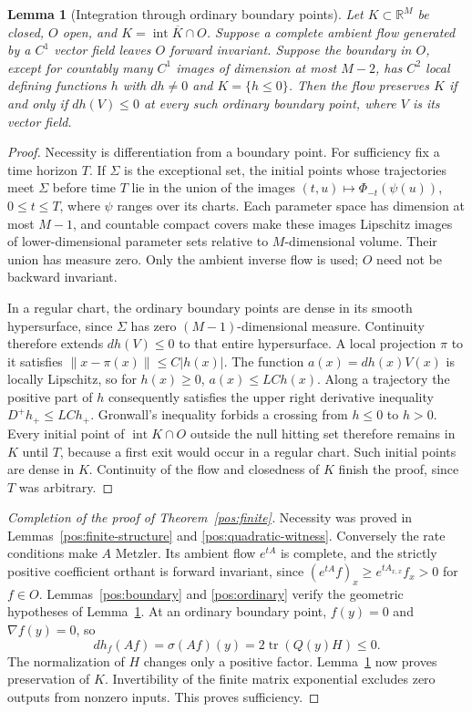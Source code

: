 \documentclass[reqno]{amsart}
\newtheorem{lemma}[theorem]{Lemma}
\theoremstyle{definition}
\theoremstyle{remark}
\newcommand{\R}{\mathbb R}
\begin{document}
\begin{lemma}[Integration through ordinary boundary points]\label{pos:integration}
Let \(K\subset\R^M\) be closed, \(O\) open, and
\(K=\overline{\operatorname{int}K\cap O}\).
Suppose a complete ambient flow generated by a \(C^1\) vector field leaves
\(O\) forward invariant.
Suppose the boundary in \(O\), except for countably many \(C^1\) images of
dimension at most \(M-2\), has \(C^2\) local defining functions \(h\) with
\(dh\ne0\) and \(K=\{h\le0\}\).
Then the flow preserves \(K\) if and only if \(dh(V)\le0\) at every such
ordinary boundary point, where \(V\) is its vector field.
\end{lemma}
\begin{proof}
Necessity is differentiation from a boundary point.
For sufficiency fix a time horizon \(T\).  If \(\Sigma\) is the exceptional set,
the initial points whose trajectories meet \(\Sigma\) before time \(T\) lie in
the union of the images
\((t,u)\mapsto\Phi_{-t}(\psi(u))\), \(0\le t\le T\), where \(\psi\) ranges
over its charts.  Each parameter space has dimension at most \(M-1\), and
countable compact covers make these images Lipschitz images of lower-dimensional
parameter sets relative to \(M\)-dimensional volume.  Their union has measure zero.
Only the ambient inverse flow is used; \(O\) need not be backward invariant.

In a regular chart, the ordinary boundary points are dense in its smooth
hypersurface, since \(\Sigma\) has zero \((M-1)\)-dimensional measure.
Continuity therefore extends \(dh(V)\le0\) to that entire hypersurface.
A local projection \(\pi\) to it satisfies
\(\|x-\pi(x)\|\le C|h(x)|\).
The function \(a(x)=dh(x)V(x)\) is locally Lipschitz, so for \(h(x)\ge0\),
\(a(x)\le LC h(x)\).
Along a trajectory the positive part of \(h\) consequently satisfies the upper
right derivative inequality \(D^+h_+\le LC h_+\).
Gronwall's inequality forbids a crossing from \(h\le0\) to \(h>0\).
Every initial point of \(\operatorname{int}K\cap O\) outside the null hitting set
therefore remains in \(K\) until \(T\), because a first exit would occur in a
regular chart.  Such initial points are dense in \(K\).
Continuity of the flow and closedness of \(K\) finish the proof, since \(T\)
was arbitrary.
\end{proof}

\begin{proof}[Completion of the proof of Theorem~\ref{pos:finite}]
Necessity was proved in Lemmas~\ref{pos:finite-structure} and
\ref{pos:quadratic-witness}.  Conversely the rate conditions make \(A\) Metzler.
Its ambient flow \(e^{tA}\) is complete, and the strictly positive coefficient
orthant is forward invariant, since
\((e^{tA}f)_x\ge e^{tA_{x,x}}f_x>0\) for \(f\in O\).
Lemmas~\ref{pos:boundary} and \ref{pos:ordinary} verify the geometric hypotheses
of Lemma~\ref{pos:integration}.
At an ordinary boundary point, \(f(y)=0\) and \(\nabla f(y)=0\), so
\[
 dh_f(Af)=\sigma(Af)(y)=2\operatorname{tr}(Q(y)H)\le0.
\]
The normalization of \(H\) changes only a positive factor.
Lemma~\ref{pos:integration} now proves preservation of \(K\).
Invertibility of the finite matrix exponential excludes zero outputs from
nonzero inputs.  This proves sufficiency.
\end{proof}
\end{document}
